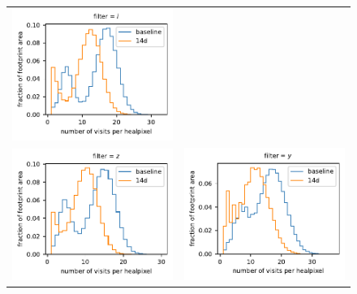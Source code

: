 \documentclass[preprintm,linenumbers]{aastex631}
\begin{document}
\begin{figure}
\begin{tabular}{@{}c@{}c@{}}
				\includegraphics{results/histograms/hist_first_year_one_snap_v4_0_10yrs_db_noDD_noTwi_CountMetric_doAllTemplateMetrics_reduceCount_i_14_noDD_noTwi.pdf} \\
				 \includegraphics{results/histograms/hist_first_year_one_snap_v4_0_10yrs_db_noDD_noTwi_CountMetric_doAllTemplateMetrics_reduceCount_z_14_noDD_noTwi.pdf} &
				\includegraphics{results/histograms/hist_first_year_one_snap_v4_0_10yrs_db_noDD_noTwi_CountMetric_doAllTemplateMetrics_reduceCount_y_14_noDD_noTwi.pdf} \\
    			

\end{tabular}
\end{figure}
\end{document}
